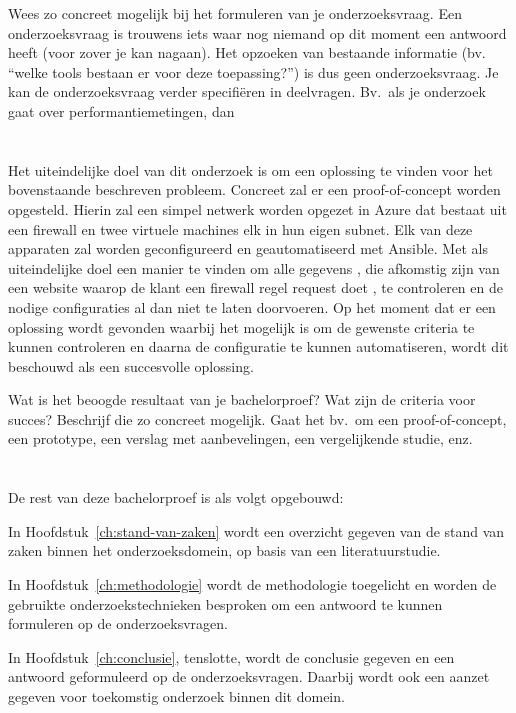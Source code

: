 Wees zo concreet mogelijk bij het formuleren van je onderzoeksvraag. Een onderzoeksvraag is trouwens iets waar nog niemand op dit moment een antwoord heeft (voor zover je kan nagaan). Het opzoeken van bestaande informatie (bv. ``welke tools bestaan er voor deze toepassing?'') is dus geen onderzoeksvraag. Je kan de onderzoeksvraag verder specifiëren in deelvragen. Bv.~als je onderzoek gaat over performantiemetingen, dan 

\section{}%
\label{sec:onderzoeksdoelstelling}
Het uiteindelijke doel van dit onderzoek is om een oplossing te vinden voor het bovenstaande beschreven probleem. Concreet zal er een proof-of-concept worden opgesteld. Hierin zal een simpel netwerk worden opgezet in Azure dat bestaat uit een firewall en twee virtuele machines elk in hun eigen subnet. Elk van deze apparaten zal worden geconfigureerd en geautomatiseerd met Ansible. Met als uiteindelijke doel een manier te vinden om alle gegevens , die afkomstig zijn van een website waarop de klant een firewall regel request doet , te controleren en de nodige configuraties al dan niet te laten doorvoeren. Op het moment dat er een oplossing wordt gevonden waarbij het mogelijk is om de gewenste criteria te kunnen controleren en daarna de configuratie te kunnen automatiseren, wordt dit beschouwd als een succesvolle oplossing. 

Wat is het beoogde resultaat van je bachelorproef? Wat zijn de criteria voor succes? Beschrijf die zo concreet mogelijk. Gaat het bv.\ om een proof-of-concept, een prototype, een verslag met aanbevelingen, een vergelijkende studie, enz.

\section{}%
\label{sec:opzet-bachelorproef}


De rest van deze bachelorproef is als volgt opgebouwd:

In Hoofdstuk~\ref{ch:stand-van-zaken} wordt een overzicht gegeven van de stand van zaken binnen het onderzoeksdomein, op basis van een literatuurstudie.

In Hoofdstuk~\ref{ch:methodologie} wordt de methodologie toegelicht en worden de gebruikte onderzoekstechnieken besproken om een antwoord te kunnen formuleren op de onderzoeksvragen.


In Hoofdstuk~\ref{ch:conclusie}, tenslotte, wordt de conclusie gegeven en een antwoord geformuleerd op de onderzoeksvragen. Daarbij wordt ook een aanzet gegeven voor toekomstig onderzoek binnen dit domein.